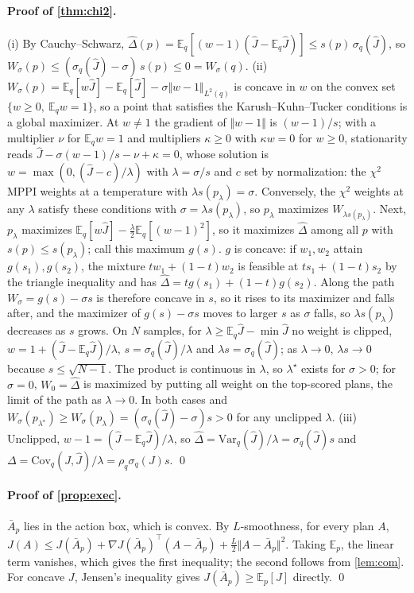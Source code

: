 \documentclass{article}
\theoremstyle{plain}
\theoremstyle{remark}
\newcommand{\E}{\mathbb{E}}
\newcommand{\Jh}{\hat{J}}
\newcommand{\Cov}{\mathrm{Cov}}
\newcommand{\Var}{\mathrm{Var}}
\begin{document}
\paragraph{Proof of \cref{thm:chi2}.} (i) By Cauchy--Schwarz, $\hat\Delta(p)=\E_q[(w-1)(\Jh-\E_q\Jh)]\le s(p)\,\sigma_q(\Jh)$, so
$W_\sigma(p)\le(\sigma_q(\Jh)-\sigma)\,s(p)\le0=W_\sigma(q)$.
(ii) $W_\sigma(p)=\E_q[w\Jh]-\E_q[\Jh]-\sigma\Vert w-1\Vert_{L^2(q)}$ is concave in $w$ on the convex set
$\{w\ge0,\ \E_qw=1\}$, so a point that satisfies the Karush--Kuhn--Tucker conditions is a global maximizer. At $w\ne1$
the gradient of $\Vert w-1\Vert$ is $(w-1)/s$; with a multiplier $\nu$ for $\E_qw=1$ and multipliers $\kappa\ge0$ with
$\kappa w=0$ for $w\ge0$, stationarity reads $\Jh-\sigma(w-1)/s-\nu+\kappa=0$, whose solution is
$w=\max(0,(\Jh-c)/\lambda)$ with $\lambda=\sigma/s$ and $c$ set by normalization: the $\chi^2$ MPPI weights at a
temperature with $\lambda s(p_\lambda)=\sigma$. Conversely, the $\chi^2$ weights at any $\lambda$ satisfy these conditions
with $\sigma=\lambda s(p_\lambda)$, so $p_\lambda$ maximizes $W_{\lambda s(p_\lambda)}$. Next, $p_\lambda$ maximizes
$\E_q[w\Jh]-\tfrac\lambda2\E_q[(w-1)^2]$, so it maximizes $\hat\Delta$ among all $p$ with $s(p)\le s(p_\lambda)$; call
this maximum $g(s)$. $g$ is concave: if $w_1,w_2$ attain $g(s_1),g(s_2)$, the mixture $tw_1+(1-t)w_2$ is feasible at
$ts_1+(1-t)s_2$ by the triangle inequality and has $\hat\Delta=tg(s_1)+(1-t)g(s_2)$. Along the path $W_\sigma=g(s)-\sigma
s$ is therefore concave in $s$, so it rises to its maximizer and falls after, and the maximizer of $g(s)-\sigma s$ moves
to larger $s$ as $\sigma$ falls, so $\lambda s(p_\lambda)$ decreases as $s$ grows. On $N$ samples, for
$\lambda\ge\E_q\Jh-\min\Jh$ no weight is clipped, $w=1+(\Jh-\E_q\Jh)/\lambda$, $s=\sigma_q(\Jh)/\lambda$ and
$\lambda s=\sigma_q(\Jh)$; as $\lambda\to0$, $\lambda s\to0$ because $s\le\sqrt{N-1}$. The product is continuous in
$\lambda$, so $\lambda^\star$ exists for $\sigma>0$; for $\sigma=0$, $W_0=\hat\Delta$ is maximized by putting all weight
on the top-scored plans, the limit of the path as $\lambda\to0$. In both cases and $W_\sigma(p_{\lambda^\star})\ge W_\sigma(p_\lambda)=(\sigma_q(\Jh)-\sigma)s>0$
for any unclipped $\lambda$.
(iii) Unclipped, $w-1=(\Jh-\E_q\Jh)/\lambda$, so $\hat\Delta=\Var_q(\Jh)/\lambda=\sigma_q(\Jh)s$ and
$\Delta=\Cov_q(J,\Jh)/\lambda=\rho_q\sigma_q(J)s$. \qed

\paragraph{Proof of \cref{prop:exec}.} $\bar A_p$ lies in the action box, which is convex. By $L$-smoothness, for every plan $A$,
$J(A)\le J(\bar A_p)+\nabla J(\bar A_p)^\top(A-\bar A_p)+\tfrac L2\Vert A-\bar A_p\Vert^2$. Taking $\E_p$, the linear term
vanishes, which gives the first inequality; the second follows from \cref{lem:com}. For concave $J$, Jensen's inequality
gives $J(\bar A_p)\ge\E_p[J]$ directly. \qed
\end{document}
